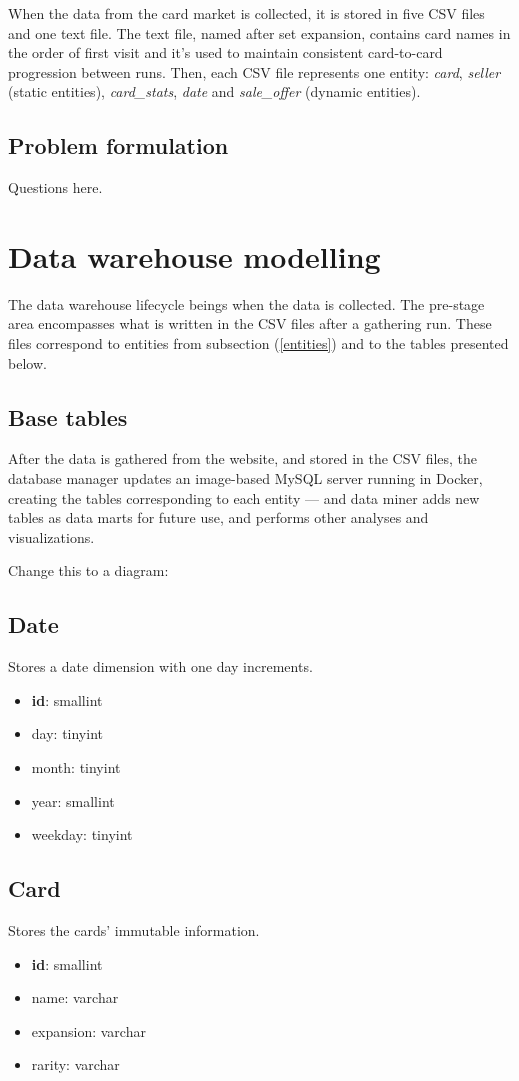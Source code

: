 When the data from the card market is collected, it is stored in five CSV files and one text file. The text file, named after set expansion, contains card names in the order of first visit and it's used to maintain consistent card-to-card progression between runs. Then, each CSV file represents one entity: \textit{card}, \textit{seller} (static entities), \textit{card\_stats}, \textit{date} and \textit{sale\_offer} (dynamic entities).

\subsection{Problem formulation}
Questions here.

\section{Data warehouse modelling}
The data warehouse lifecycle beings when the data is collected. The pre-stage area encompasses what is written in the CSV files after a gathering run. These files correspond to entities from subsection (\ref{entities}) and to the tables presented below.

\subsection{Base tables}
After the data is gathered from the website, and stored in the CSV files, the database manager updates an image-based MySQL server running in Docker, creating the tables corresponding to each entity --- and data miner adds new tables as data marts for future use, and performs other analyses and visualizations.

Change this to a diagram:

\subsection*{Date}
Stores a date dimension with one day increments.
\begin{itemize}
\setlength\itemsep{0.2em}
\item \textbf{id}: smallint
\item day: tinyint
\item month: tinyint
\item year: smallint
\item weekday: tinyint
\end{itemize}

\subsection*{Card}
Stores the cards' immutable information.
\begin{itemize}
\setlength\itemsep{0.2em}
\item \textbf{id}: smallint
\item name: varchar
\item expansion: varchar
\item rarity: varchar
\end{itemize}

